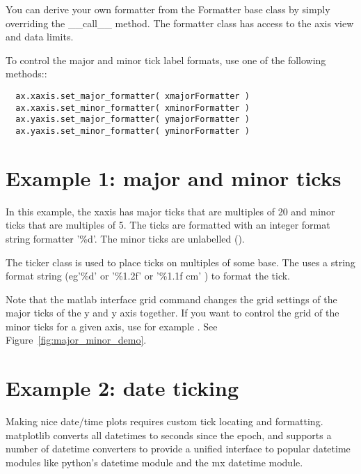 \documentclass[twoside]{book}
\begin{document}
You can derive your own formatter from the Formatter base class by
simply overriding the \_\_call\_\_ method.  The formatter class has
access to the axis view and data limits.

To control the major and minor tick label formats, use one of the
following methods::

\begin{lstlisting}
  ax.xaxis.set_major_formatter( xmajorFormatter )
  ax.xaxis.set_minor_formatter( xminorFormatter )
  ax.yaxis.set_major_formatter( ymajorFormatter )
  ax.yaxis.set_minor_formatter( yminorFormatter )

\end{lstlisting}

\section{Example 1: major and minor ticks}

In this example, the xaxis has major ticks that are multiples of 20
and minor ticks that are multiples of 5.  The ticks are formatted with
an integer format string formatter '\%d'.  The minor ticks are
unlabelled ().

The  ticker class is used to place ticks on
multiples of some base.  The  uses a string format
string (eg'\%d' or '\%1.2f' or '\%1.1f cm' ) to format the tick.

Note that the matlab interface grid command changes the grid settings
of the major ticks of the y and y axis together.  If you want to
control the grid of the minor ticks for a given axis, use for example
.  See
Figure~\ref{fig:major_minor_demo}.





\section{Example 2: date ticking}

Making nice date/time plots requires custom tick locating and
formatting.  matplotlib converts all datetimes to seconds since the
epoch, and supports a number of datetime converters to provide a
unified interface to popular datetime modules like python's datetime
module and the mx datetime module.
\end{document}
